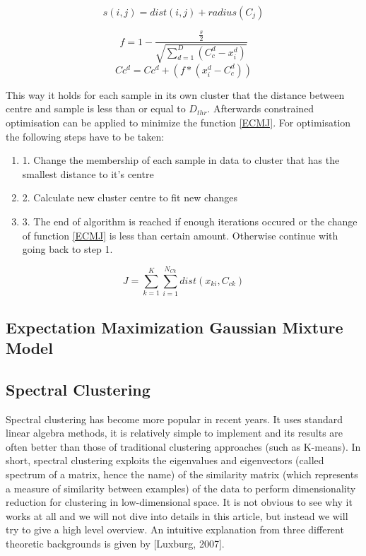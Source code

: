 \documentclass[conference]{IEEEtran}
\begin{document}
\begin{equation}\label{ECMequ1}
s(i, j) = dist(i,j) + radius(C_j)
\end{equation}

\begin{equation}\label{ECMequ2}
f = 1 - \frac {\frac {s} {2}} {\sqrt{ \sum_{d=1}^{D} (C_c^d - x_i^d)}}
\end{equation}
\begin{equation}\label{ECMequ3}
Cc^d = Cc^d + (f * (x_i^d - C_c^d))
\end{equation}

This way it holds for each sample in its own cluster that the distance between centre and sample is less than or equal to $D_{thr}$. Afterwards constrained optimisation can be applied to minimize the function \ref{ECMJ}. For optimisation the following steps have to be taken:
\begin{enumerate}
\item 1. Change the membership of each sample in data to cluster that has the smallest distance to it's centre
\item 2. Calculate new cluster centre to fit new changes
\item 3. The end of algorithm is reached if enough iterations occured or the change of function \ref{ECMJ} is less than certain amount. Otherwise continue with going back to step 1.
\end{enumerate}

\begin{equation}\label{ECMJ}
J = \sum_{k=1}^K \sum_{i=1}^{N_{Ck}} dist(x_{ki}, C_{ck})
\end{equation}

\subsection{Expectation Maximization Gaussian Mixture Model}

\subsection{Spectral Clustering}
Spectral clustering has become more popular in recent years. It uses standard linear algebra
methods, it is relatively simple to implement and its results are often better than those of
traditional clustering approaches (such as K-means). In short, spectral clustering exploits the
eigenvalues and eigenvectors (called spectrum of a matrix, hence the name) of the similarity matrix
(which represents
a measure of similarity between examples) of the data to perform dimensionality reduction for
clustering in low-dimensional space. It is not obvious to see why it works at all
and we will not dive into details in this article, but instead we will try to give a high level overview.
An intuitive explanation from three different theoretic backgrounds is given by [Luxburg, 2007].
\end{document}
